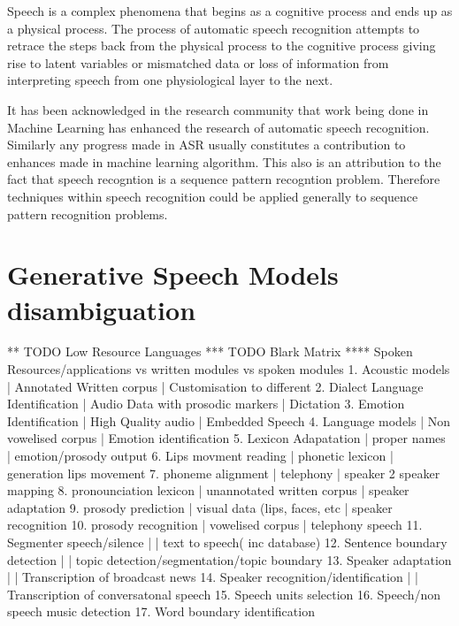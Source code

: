 Speech is a complex phenomena that begins as a cognitive process and ends up as a physical process.  The process of automatic speech recognition attempts to retrace the steps back from the physical process to the cognitive process giving rise to latent variables or mismatched data or loss of information from interpreting speech from one physiological layer to the next.

It has been acknowledged in the research community \citep{2015watanabe,deng2013machine}  that work being done in Machine Learning has enhanced the research of automatic speech recognition.  Similarly any progress made in ASR usually constitutes a contribution to enhances made in machine learning algorithm.  This also is an attribution to the fact that speech recogntion is a sequence pattern recogntion problem.  Therefore techniques within speech recognition could be applied generally to sequence pattern recognition problems.

\iffalse
** TODO Uses of ASR ([[https://www.dropbox.com/s/ly7lwhljsxhuos1/forced_alignment_slides.pdf?dl=0][University of Oxford]]) 
- As a toolbox
- As a methodology
\fi

\section{Generative Speech Models disambiguation}
\pagestyle{fancy}
** TODO Low Resource Languages
*** TODO Blark Matrix
**** Spoken Resources/applications vs written modules vs spoken modules
1. Acoustic models | Annotated Written corpus | Customisation to different 
2. Dialect Language Identification | Audio Data with prosodic markers | Dictation
3. Emotion Identification | High Quality audio | Embedded Speech
4. Language models | Non vowelised corpus | Emotion identification
5. Lexicon Adapatation | proper names | emotion/prosody output
6. Lips movment reading | phonetic lexicon | generation lips movement
7. phoneme alignment | telephony | speaker 2 speaker mapping
8. pronounciation lexicon | unannotated written corpus | speaker adaptation 
9. prosody prediction | visual data (lips, faces, etc | speaker recognition
10. prosody recognition | vowelised corpus | telephony speech 
11. Segmenter speech/silence | | text to speech( inc database) 
12. Sentence boundary detection | | topic detection/segmentation/topic boundary
13. Speaker adaptation | | Transcription of broadcast news
14. Speaker recognition/identification | | Transcription of conversatonal speech
15. Speech units selection 
16. Speech/non speech music detection
17. Word boundary identification

